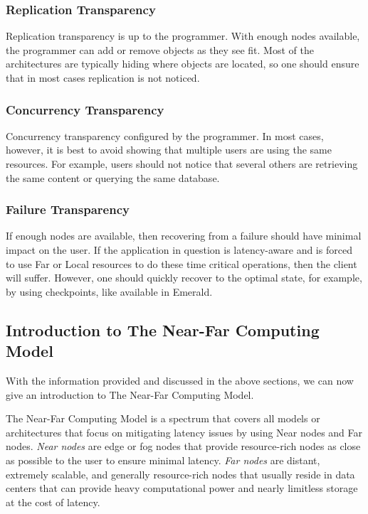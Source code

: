\subsubsection{Replication Transparency}
Replication transparency is up to the programmer. With enough nodes available, the programmer can add or remove objects as they see fit. Most of the architectures are typically hiding where objects are located, so one should ensure that in most cases replication is not noticed.

\subsubsection{Concurrency Transparency}
Concurrency transparency configured by the programmer. In most cases, however, it is best to avoid showing that multiple users are using the same resources. For example, users should not notice that several others are retrieving the same content or querying the same database. 

\subsubsection{Failure Transparency}
If enough nodes are available, then recovering from a failure should have minimal impact on the user. If the application in question is latency-aware and is forced to use Far or Local resources to do these time critical operations, then the client will suffer. However, one should quickly recover to the optimal state, for example, by using checkpoints, like available in Emerald.








\subsection{Introduction to The Near-Far Computing Model}
With the information provided and discussed in the above sections, we can now give an introduction to The Near-Far Computing Model.

The Near-Far Computing Model is a spectrum that covers all models or architectures that focus on mitigating latency issues by using Near nodes and Far nodes. \textit{Near nodes} are edge or fog nodes that provide resource-rich nodes as close as possible to the user to ensure minimal latency. \textit{Far nodes} are distant, extremely scalable, and generally resource-rich nodes that usually reside in data centers that can provide heavy computational power and nearly limitless storage at the cost of latency.

